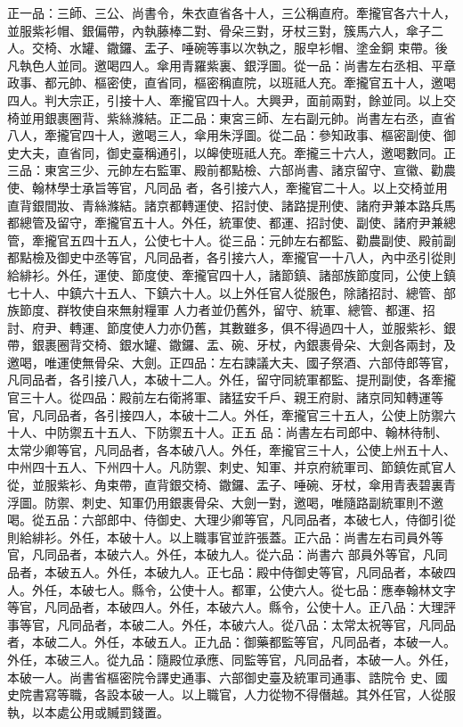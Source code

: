 \begin{pinyinscope}
 正一品：三師、三公、尚書令，朱衣直省各十人，三公稱直府。牽攏官各六十人，並服紫衫帽、銀偏帶，內執藤棒二對、骨朵三對，牙杖三對，簇馬六人，傘子二人。交椅、水罐、鏾鑼、盂子、唾碗等事以次執之，服皁衫帽、塗金銅
 束帶。後凡執色人並同。邀喝四人。傘用青羅紫裏、銀浮圖。從一品：尚書左右丞相、平章政事、都元帥、樞密使，直省同，樞密稱直院，以班祗人充。牽攏官五十人，邀喝四人。判大宗正，引接十人、牽攏官四十人。大興尹，面前兩對，餘並同。以上交椅並用銀裹圈背、紫絲滌結。正二品：東宮三師、左右副元帥。尚書左右丞，直省八人，牽攏官四十人，邀喝三人，傘用朱浮圖。從二品：參知政事、樞密副使、御史大夫，直省同，御史臺稱通引，以皞使班祗人充。牽攏三十六人，邀喝數同。正三品：東宮三少、元帥左右監軍、殿前都點檢、六部尚書、諸京留守、宣徽、勸農使、翰林學士承旨等官，凡同品
 者，各引接六人，牽攏官二十人。以上交椅並用直背銀間妝、青絲滌結。諸京都轉運使、招討使、諸路提刑使、諸府尹兼本路兵馬都總管及留守，牽攏官五十人。外任，統軍使、都運、招討使、副使、諸府尹兼總管，牽攏官五四十五人，公使七十人。從三品：元帥左右都監、勸農副使、殿前副都點檢及御史中丞等官，凡同品者，各引接六人，牽攏官一十八人，內中丞引從則給緋衫。外任，運使、節度使、牽攏官四十人，諸節鎮、諸部族節度同，公使上鎮七十人、中鎮六十五人、下鎮六十人。以上外任官人從服色，除諸招討、總管、部族節度、群牧使自來無射糧軍
 人力者並仍舊外，留守、統軍、總管、都運、招討、府尹、轉運、節度使人力亦仍舊，其數雖多，俱不得過四十人，並服紫衫、銀帶，銀裹圈背交椅、銀水罐、鏾鑼、盂、碗、牙杖，內銀裹骨朵、大劍各兩封，及邀喝，唯運使無骨朵、大劍。正四品：左右諫議大夫、國子祭酒、六部侍郎等官，凡同品者，各引接八人，本破十二人。外任，留守同統軍都監、提刑副使，各牽攏官三十人。從四品：殿前左右衛將軍、諸猛安千戶、親王府尉、諸京同知轉運等官，凡同品者，各引接四人，本破十二人。外任，牽攏官三十五人，公使上防禦六十人、中防禦五十五人、下防禦五十人。正五
 品：尚書左右司郎中、翰林待制、太常少卿等官，凡同品者，各本破八人。外任，牽攏官三十人，公使上州五十人、中州四十五人、下州四十人。凡防禦、刺史、知軍、并京府統軍司、節鎮佐貳官人從，並服紫衫、角束帶，直背銀交椅、鏾鑼、盂子、唾碗、牙杖，傘用青表碧裏青浮圖。防禦、刺史、知軍仍用銀裹骨朵、大劍一對，邀喝，唯隨路副統軍則不邀喝。從五品：六部郎中、侍御史、大理少卿等官，凡同品者，本破七人，侍御引從則給緋衫。外任，本破十人。以上職事官並許張蓋。正六品：尚書左右司員外等官，凡同品者，本破六人。外任，本破九人。從六品：尚書六
 部員外等官，凡同品者，本破五人。外任，本破九人。正七品：殿中侍御史等官，凡同品者，本破四人。外任，本破七人。縣令，公使十人。都軍，公使六人。從七品：應奉翰林文字等官，凡同品者，本破四人。外任，本破六人。縣令，公使十人。正八品：大理評事等官，凡同品者，本破二人。外任，本破六人。從八品：太常太祝等官，凡同品者，本破二人。外任，本破五人。正九品：御藥都監等官，凡同品者，本破一人。外任，本破三人。從九品：隨殿位承應、同監等官，凡同品者，本破一人。外任，本破一人。尚書省樞密院令譯史通事、六部御史臺及統軍司通事、誥院令
 史、國史院書寫等職，各設本破一人。以上職官，人力從物不得僭越。其外任官，人從服執，以本處公用或贓罰錢置。




\end{pinyinscope}
